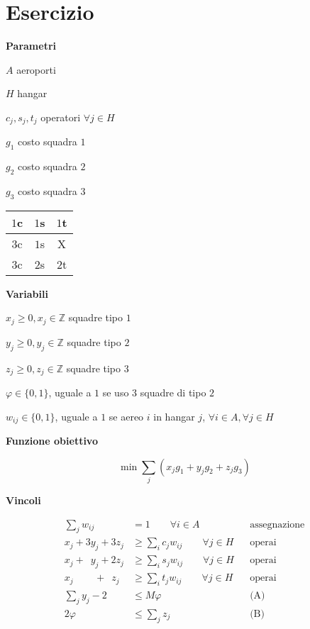 \documentclass[10pt,a4paper,twoside,openright]{book}
\newcounter{es}
\newcommand{\Es}{
	\stepcounter{es}
	\section{Esercizio \arabic{es}}
	}
\newcommand{\Par}{\textbf{Parametri}}
\newcommand{\Var}{\textbf{Variabili}}
\newcommand{\Fob}{\textbf{Funzione obiettivo}}
\newcommand{\Vin}{\textbf{Vincoli}}
\begin{document}
\Es

\Par

$A$ aeroporti

$H$ hangar

$c_{j},s_{j},t_{j}$ operatori $\forall j\in H$

$g_{1}$ costo squadra $1$

$g_{2}$ costo squadra $2$

$g_{3}$ costo squadra $3$

\begin{center}
	
	\begin{tabular}{|c|c|c|}
		\hline 
		$1$c & $1$s & $1$t \\
		\hline 
		$3$c & $1$s & X    \\
		\hline 
		$3$c & $2$s & $2$t \\
		\hline
	\end{tabular}
\end{center}

\Var

$x_{j} \geq 0,x_{j} \in \mathbb{Z}$ squadre tipo $1$

$y_{j} \geq 0,y_{j} \in \mathbb{Z}$ squadre tipo $2$

$z_{j} \geq 0,z_{j} \in \mathbb{Z}$ squadre tipo $3$

$\varphi \in \{0,1\}$, uguale a $1$ se uso 3 squadre di tipo $2$

$w_{ij} \in \{0,1\}$, uguale a $1$ se aereo $i$ in hangar $j$, $\forall i\in A,\forall j\in H$

\Fob

\begin{equation*}
	\min \sum _{j}( x_{j} g_{1} +y_{j} g_{2} +z_{j} g_{3})
\end{equation*}

\Vin

\begin{align*}
	\sum _{j} w_{ij} &=1\qquad\forall i\in A&&\text{assegnazione}\\
	x_{j} +3y_{j} +3z_{j} &\geq \sum _{i} c_{j} w_{ij} \qquad\forall j\in H &&\text{operai}\\
	x_{j} +\phantom{3}y_{j}  +2z_{j} &\geq \sum _{i} s_{j} w_{ij} \qquad\forall j\in H &&\text{operai}\\
	x_{j} \phantom{+3y_{j}}  +\phantom{2}z_{j}  &\geq \sum _{i} t_{j} w_{ij} \qquad\forall j\in H &&\text{operai}\\
	\sum _{j} y_{j} -2&\leq M\varphi &&\text{(A)}\\
	2\varphi &\leq \sum _{j} z_{j}&&\text{(B)}
\end{align*}
\end{document}
